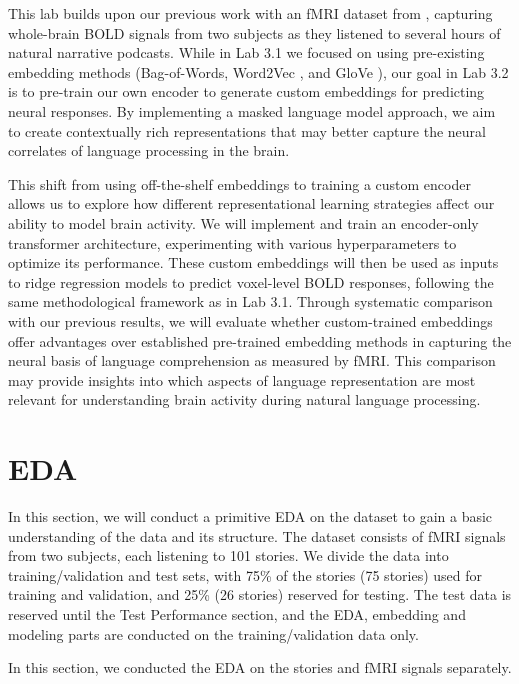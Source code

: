 \documentclass[10pt,letterpaper]{article}
\begin{document}
This lab builds upon our previous work with an fMRI dataset from \cite{jain2018incorporating}, capturing whole-brain BOLD signals from two subjects as they listened to several hours of natural narrative podcasts. While in Lab 3.1 we focused on using pre-existing embedding methods (Bag-of-Words, Word2Vec \cite{mikolov2013efficient}, and GloVe \cite{pennington2014glove}), our goal in Lab 3.2 is to pre-train our own encoder to generate custom embeddings for predicting neural responses. By implementing a masked language model approach, we aim to create contextually rich representations that may better capture the neural correlates of language processing in the brain.

This shift from using off-the-shelf embeddings to training a custom encoder allows us to explore how different representational learning strategies affect our ability to model brain activity. We will implement and train an encoder-only transformer architecture, experimenting with various hyperparameters to optimize its performance. These custom embeddings will then be used as inputs to ridge regression models to predict voxel-level BOLD responses, following the same methodological framework as in Lab 3.1. Through systematic comparison with our previous results, we will evaluate whether custom-trained embeddings offer advantages over established pre-trained embedding methods in capturing the neural basis of language comprehension as measured by fMRI. This comparison may provide insights into which aspects of language representation are most relevant for understanding brain activity during natural language processing.

\section{EDA}
In this section, we will conduct a primitive EDA on the dataset to gain a basic understanding of the data and its structure. The dataset consists of fMRI signals from two subjects, each listening to 101 stories. We divide the data into training/validation and test sets, with 75\% of the stories (75 stories) used for training and validation, and 25\% (26 stories) reserved for testing. The test data is reserved until the Test Performance section, and the EDA, embedding and modeling parts are conducted on the training/validation data only. 

In this section, we conducted the EDA on the stories and fMRI signals separately.
\end{document}

